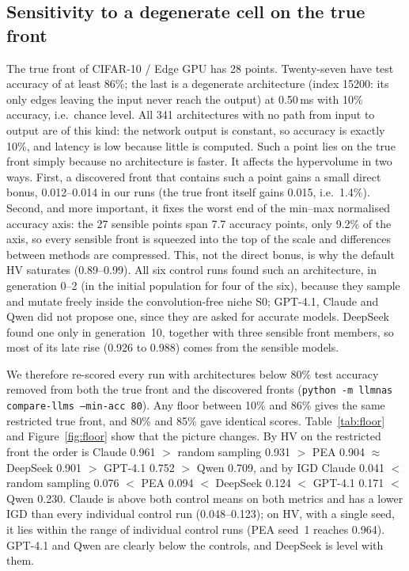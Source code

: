 \documentclass[11pt,a4paper]{article}
\newcommand{\code}[1]{\texttt{#1}}
\begin{document}
\subsection{Sensitivity to a degenerate cell on the true front}\label{sec:degenerate}
The true front of CIFAR-10 / Edge GPU has 28 points. Twenty-seven have test accuracy of at least 86\%; the last is a degenerate architecture (index 15200: its only edges leaving the input never reach the output) at 0.50\,ms with 10\% accuracy, i.e.\ chance level. All 341 architectures with no path from input to output are of this kind: the network output is constant, so accuracy is exactly 10\%, and latency is low because little is computed. Such a point lies on the true front simply because no architecture is faster. It affects the hypervolume in two ways. First, a discovered front that contains such a point gains a small direct bonus, 0.012--0.014 in our runs (the true front itself gains 0.015, i.e.\ 1.4\%). Second, and more important, it fixes the worst end of the min--max normalised accuracy axis: the 27 sensible points span 7.7 accuracy points, only 9.2\% of the axis, so every sensible front is squeezed into the top of the scale and differences between methods are compressed. This, not the direct bonus, is why the default HV saturates (0.89--0.99). All six control runs found such an architecture, in generation 0--2 (in the initial population for four of the six), because they sample and mutate freely inside the convolution-free niche S0; GPT-4.1, Claude and Qwen did not propose one, since they are asked for accurate models. DeepSeek found one only in generation~10, together with three sensible front members, so most of its late rise (0.926 to 0.988) comes from the sensible models.

We therefore re-scored every run with architectures below 80\% test accuracy removed from both the true front and the discovered fronts (\code{python -m llmnas compare-llms --min-acc 80}). Any floor between 10\% and 86\% gives the same restricted true front, and 80\% and 85\% gave identical scores. Table~\ref{tab:floor} and Figure~\ref{fig:floor} show that the picture changes. By HV on the restricted front the order is Claude 0.961 $>$ random sampling 0.931 $>$ PEA 0.904 $\approx$ DeepSeek 0.901 $>$ GPT-4.1 0.752 $>$ Qwen 0.709, and by IGD Claude 0.041 $<$ random sampling 0.076 $<$ PEA 0.094 $<$ DeepSeek 0.124 $<$ GPT-4.1 0.171 $<$ Qwen 0.230. Claude is above both control means on both metrics and has a lower IGD than every individual control run (0.048--0.123); on HV, with a single seed, it lies within the range of individual control runs (PEA seed~1 reaches 0.964). GPT-4.1 and Qwen are clearly below the controls, and DeepSeek is level with them.
\end{document}
